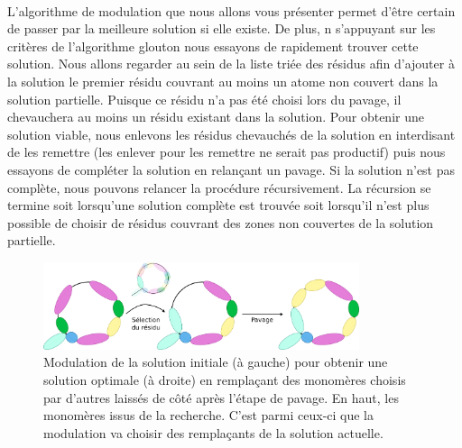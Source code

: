 \documentclass[12pt,french,twoside]{report}
\begin{document}
\paragraph{}L'algorithme de modulation que nous allons vous présenter permet d'être certain de passer par la meilleure solution si
elle existe.
De plus, n s'appuyant sur les critères de l'algorithme glouton nous essayons de rapidement trouver cette solution.
Nous allons regarder au sein de la liste triée des résidus afin d'ajouter à la solution le premier résidu couvrant au moins un
atome non couvert dans la solution partielle.
Puisque ce résidu n'a pas été choisi lors du pavage, il chevauchera au moins un résidu existant dans la solution.
Pour obtenir une solution viable, nous enlevons les résidus chevauchés de la solution en interdisant de les remettre (les enlever
pour les remettre ne serait pas productif) puis nous essayons de compléter la solution en relançant un pavage.
Si la solution n'est pas complète, nous pouvons relancer la procédure récursivement.
La récursion se termine soit lorsqu'une solution complète est trouvée soit lorsqu'il n'est plus possible de choisir de résidus
couvrant des zones non couvertes de la solution partielle.

\begin{figure}[!ht]
  \begin{center}
    \includegraphics[width=350px]{Figures/s2m/pavage/modulation.png}
    \caption{\label{modulation}Modulation de la solution initiale (à gauche) pour obtenir une solution optimale (à droite) en remplaçant des monomères choisis par d'autres laissés de côté après l'étape de pavage.
    En haut, les monomères issus de la recherche.
    C'est parmi ceux-ci que la modulation va choisir des remplaçants de la solution actuelle.}
  \end{center}
\end{figure}
\end{document}
